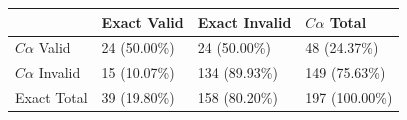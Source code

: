\begin{tabular}{llll}
\toprule
 & Exact Valid & Exact Invalid & $C\alpha$ Total \\
\midrule
$C\alpha$ Valid & 24 (50.00\%) & 24 (50.00\%) & 48 (24.37\%) \\
$C\alpha$ Invalid & 15 (10.07\%) & 134 (89.93\%) & 149 (75.63\%) \\
Exact Total & 39 (19.80\%) & 158 (80.20\%) & 197 (100.00\%) \\
\bottomrule
\end{tabular}
